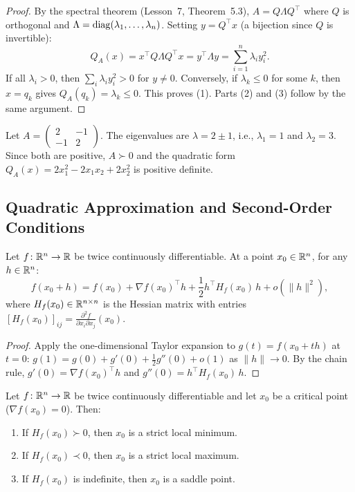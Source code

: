\documentclass[11pt,a4paper]{article}
\begin{document}
\begin{proof}
By the spectral theorem (Lesson~7, Theorem~5.3), $A = Q \Lambda Q^\top$
where $Q$ is orthogonal and $\Lambda = \operatorname{diag}(\lambda_1, \ldots, \lambda_n)$.
Setting $y = Q^\top x$ (a bijection since $Q$ is invertible):
\[
  Q_A(x) = x^\top Q \Lambda Q^\top x = y^\top \Lambda y
  = \sum_{i=1}^n \lambda_i y_i^2.
\]
If all $\lambda_i > 0$, then $\sum_i \lambda_i y_i^2 > 0$ for $y \neq 0$.
Conversely, if $\lambda_k \leq 0$ for some $k$, then $x = q_k$ gives
$Q_A(q_k) = \lambda_k \leq 0$.  This proves (1).  Parts (2) and (3)
follow by the same argument.
\end{proof}

\begin{example}
\label{ex:classify_qf}
Let $A = \begin{pmatrix} 2 & -1 \\ -1 & 2 \end{pmatrix}$.  The
eigenvalues are $\lambda = 2 \pm 1$, i.e., $\lambda_1 = 1$ and
$\lambda_2 = 3$.  Since both are positive, $A \succ 0$ and the
quadratic form $Q_A(x) = 2x_1^2 - 2x_1 x_2 + 2x_2^2$ is positive
definite.
\end{example}

\subsection{Quadratic Approximation and Second-Order Conditions}

\begin{theorem}
\label{thm:taylor_second_order}
Let $f\colon \mathbb{R}^n \to \mathbb{R}$ be twice continuously differentiable.  At a
point $x_0 \in \mathbb{R}^n$, for any $h \in \mathbb{R}^n$:
\[
  f(x_0 + h) = f(x_0) + \nabla f(x_0)^\top h
  + \frac{1}{2} h^\top H_f(x_0)\, h + o(\|h\|^2),
\]
where $H_f(x_0) \in \mathbb{R}^{n \times n}$ is the Hessian matrix with entries
$[H_f(x_0)]_{ij} = \frac{\partial^2 f}{\partial x_i \partial x_j}(x_0)$.
\end{theorem}

\begin{proof}
Apply the one-dimensional Taylor expansion to $g(t) = f(x_0 + th)$
at $t = 0$: $g(1) = g(0) + g'(0) + \frac{1}{2}g''(0) + o(1)$ as
$\|h\| \to 0$.  By the chain rule, $g'(0) = \nabla f(x_0)^\top h$
and $g''(0) = h^\top H_f(x_0)\, h$.
\end{proof}

\begin{corollary}
\label{cor:second_order_opt}
Let $f\colon \mathbb{R}^n \to \mathbb{R}$ be twice continuously differentiable and let
$x_0$ be a critical point ($\nabla f(x_0) = 0$).  Then:
\begin{enumerate}[nosep]
  \item If $H_f(x_0) \succ 0$, then $x_0$ is a strict local minimum.
  \item If $H_f(x_0) \prec 0$, then $x_0$ is a strict local maximum.
  \item If $H_f(x_0)$ is indefinite, then $x_0$ is a saddle point.
\end{enumerate}
\end{corollary}
\end{document}
